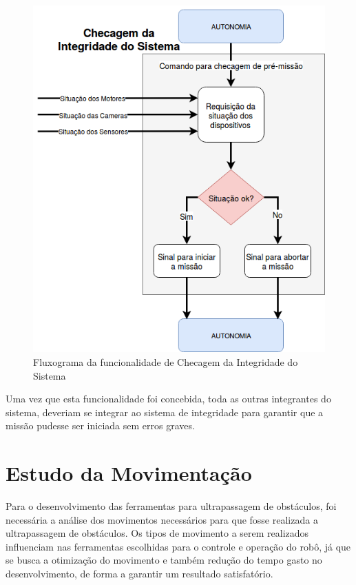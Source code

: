 \begin{figure}[H]
	\centering
	\includegraphics[scale=0.4]{Figures/sys_check_fluxPORTUGUES.png}
	\caption{Fluxograma da funcionalidade de Checagem da Integridade do Sistema}
	\label{fig:fluxo_check}
\end{figure}
Uma vez que esta funcionalidade foi concebida, toda as outras integrantes do sistema, deveriam se integrar ao sistema de integridade para garantir que a missão pudesse ser iniciada sem erros graves.

\section{Estudo da Movimentação}\label{sec:estud_mov}
Para o desenvolvimento das ferramentas para ultrapassagem de obstáculos, foi necessária a análise dos movimentos necessários para que fosse realizada a ultrapassagem de obstáculos. Os tipos de movimento a serem realizados influenciam nas ferramentas escolhidas para o controle e operação do robô, já que se busca a otimização do movimento e também redução do tempo gasto no desenvolvimento, de forma a garantir um resultado satisfatório.

